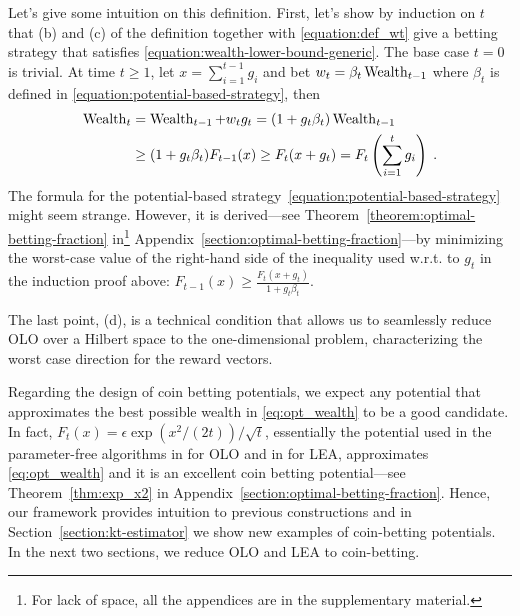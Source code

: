 Let's give some intuition on this definition.  First, let's show by induction
on $t$ that (b) and (c) of the definition together with \eqref{equation:def_wt} give a betting strategy that satisfies
\eqref{equation:wealth-lower-bound-generic}. The base case $t=0$ is trivial. At
time $t \ge 1$, let $x = \sum_{i=1}^{t-1} g_i$ and bet $w_t=\beta_t \operatorname{Wealth}_{t-1}$
where $\beta_t$ is defined in \eqref{equation:potential-based-strategy}, then
\begin{align*}
\operatorname{Wealth}_t 
&= \operatorname{Wealth}_{t-1} + w_t g_t 
= (1+g_t \beta_t) \operatorname{Wealth}_{t-1} \\
&\ge (1 + g_t \beta_t) F_{t-1}(x)
\ge F_t(x + g_t) 
= F_t \left( \sum_{i=1}^t g_i \right) \; .
\end{align*}
%
The formula for the potential-based
strategy~\eqref{equation:potential-based-strategy} might seem strange. However,
it is derived---see Theorem~\ref{theorem:optimal-betting-fraction}
in\footnote{For lack of space, all the appendices are in the supplementary
material.} Appendix~\ref{section:optimal-betting-fraction}---by minimizing the
worst-case value of the right-hand side of the inequality used w.r.t. to $g_t$
in the induction proof above: $F_{t-1}(x) \ge \tfrac{F_{t}(x +
g_t)}{1+g_t\beta_t}$.

The last point, (d), is a technical condition that allows us to seamlessly
reduce OLO over a Hilbert space to the one-dimensional problem, characterizing
the worst case direction for the reward vectors.

Regarding the design of coin betting potentials, we expect any potential that
approximates the best possible wealth in \eqref{eq:opt_wealth} to be a good
candidate.  In fact, $F_t(x)=\epsilon \exp \left(x^2/(2t)\right)/\sqrt{t}$,
essentially the potential used in the parameter-free algorithms in
\cite{McMahan-Orabona-2014, Orabona-2014} for \ac{OLO} and in
\cite{Chaudhuri-Freund-Hsu-2009, Luo-Schapire-2014, Luo-Schapire-2015} for
\ac{LEA}, approximates \eqref{eq:opt_wealth} and it is an excellent coin
betting potential---see Theorem~\ref{thm:exp_x2} in
Appendix~\ref{section:optimal-betting-fraction}. Hence, our framework provides
intuition to previous constructions and in Section~\ref{section:kt-estimator}
we show new examples of coin-betting potentials. In the next two sections, we
reduce \ac{OLO} and \ac{LEA} to coin-betting.
